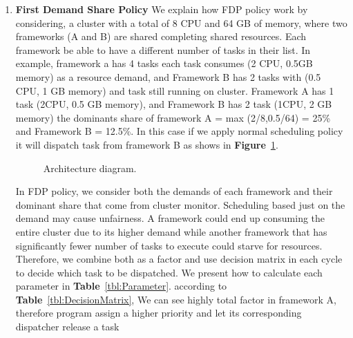 \documentclass[12pt,oneside,openright,a4paper]{cpe-english-project}
\begin{document}
\begin{enumerate}
  \item \textbf{First Demand Share Policy} We explain how FDP policy work by considering, a cluster with a total of 8 CPU and 64 GB of memory, where two frameworks (A and B) are shared completing shared resources. Each framework be able to have a different number of tasks in their list. In example, framework a has 4 tasks each task consumes (2 CPU, 0.5GB memory) as a resource demand, and Framework B has 2 tasks with (0.5 CPU, 1 GB memory) and task still running on cluster. Framework A has 1 task (2CPU, 0.5 GB memory), and Framework B has 2 task (1CPU, 2 GB memory) the dominants share of framework A = max (2/8,0.5/64) = 25\% and Framework B = 12.5\%. In this case if we apply normal scheduling policy it will dispatch task from framework B as shows in \textbf{Figure}~\ref{fig:flowDiagram}.

  \begin{figure}[!h]\centering
    \setlength{\fboxrule}{0mm} %
    \setlength{\fboxsep}{0cm}
    \caption{Architecture diagram.}\label{fig:flowDiagram}
  \end{figure}

  In FDP policy, we consider both the demands of each framework and their dominant share that come from cluster monitor. Scheduling based just on the demand may cause unfairness. A framework could end up consuming the entire cluster due to its higher demand while another framework that has significantly fewer number of tasks to execute could starve for resources. Therefore, we combine both as a factor and use decision matrix in each cycle to decide which task to be dispatched. We present how to calculate each parameter in \textbf{Table}~\ref{tbl:Parameter}. according to \textbf{Table}~\ref{tbl:DecisionMatrix}, We can see highly total factor in framework A, therefore program assign a higher priority and let its corresponding dispatcher release a task


\end{enumerate}
\end{document}
